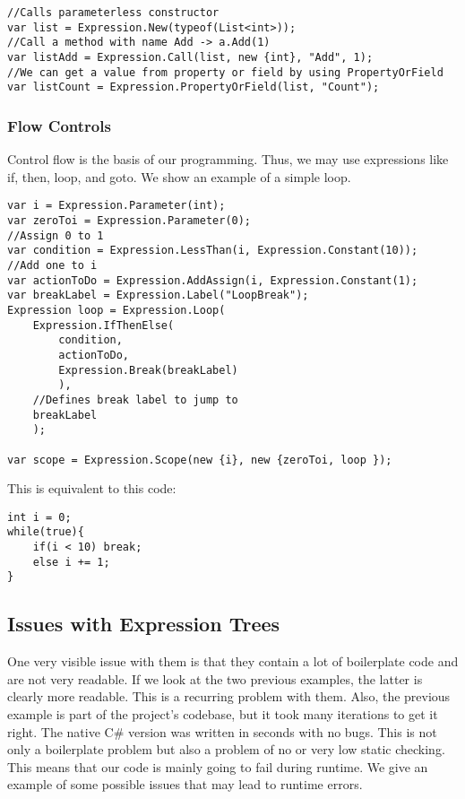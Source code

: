 \begin{lstlisting}
//Calls parameterless constructor
var list = Expression.New(typeof(List<int>));
//Call a method with name Add -> a.Add(1)
var listAdd = Expression.Call(list, new {int}, "Add", 1);
//We can get a value from property or field by using PropertyOrField
var listCount = Expression.PropertyOrField(list, "Count");
\end{lstlisting}

\subsubsection{Flow Controls}
Control flow is the basis of our programming. Thus, we may use expressions like if, then, loop, and goto. We show an example of a simple loop. 


\begin{lstlisting}
var i = Expression.Parameter(int);
var zeroToi = Expression.Parameter(0);
//Assign 0 to 1
var condition = Expression.LessThan(i, Expression.Constant(10));
//Add one to i
var actionToDo = Expression.AddAssign(i, Expression.Constant(1);
var breakLabel = Expression.Label("LoopBreak");
Expression loop = Expression.Loop(
    Expression.IfThenElse(
        condition,
        actionToDo,
        Expression.Break(breakLabel)
        ),
    //Defines break label to jump to
    breakLabel
    );

var scope = Expression.Scope(new {i}, new {zeroToi, loop });

\end{lstlisting}

This is equivalent to this code:
\begin{lstlisting}
int i = 0;
while(true){
    if(i < 10) break;
    else i += 1;
}
\end{lstlisting}

\subsection{Issues with Expression Trees}
One very visible issue with them is that they contain a lot of boilerplate code and are not very readable. If we look at the two previous examples, the latter is clearly more readable. This is a recurring problem with them. Also, the previous example is part of the project's codebase, but it took many iterations to get it right. The native C# version was written in seconds with no bugs. This is not only a boilerplate problem but also a problem of no or very low static checking. This means that our code is mainly going to fail during runtime. We give an example of some possible issues that may lead to runtime errors.

